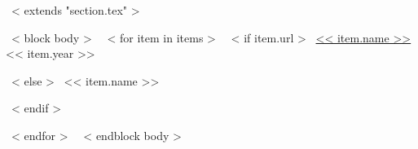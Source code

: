 ~< extends "section.tex" >~

~< block body >~
  ~< for item in items >~
    ~< if item.url >~
      \href{<< item.url >>}{<< item.name >>} \hfill << item.year >> \par  {\scriptsize \color{gray}{ << item.details >> } }
    ~< else >~
      << item.name >> \par  {\scriptsize \color{gray}{ << item.details >> } }
      ~< endif >~
     
  ~< endfor >~
~< endblock body >~
